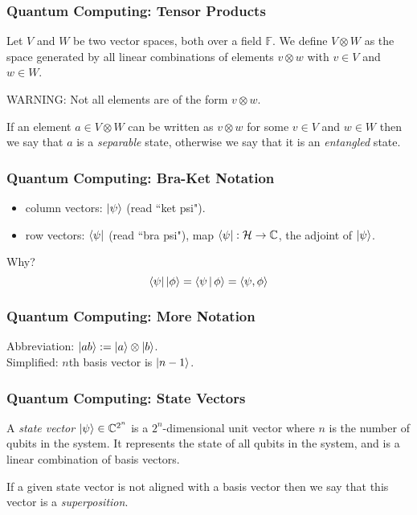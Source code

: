 \documentclass{beamer}
\renewcommand{\bra}{\Bra}
\renewcommand{\ket}{\Ket}
\renewcommand{\braket}{\Braket}
\newcommand{\inner}[2]{\left\langle #1, #2 \right\rangle}
\newcommand{\tensor}{\otimes}
\newcommand{\bb}[1]{\mathbb{#1}}
\renewcommand{\cal}[1]{\mathcal{#1}}
\begin{document}
\begin{frame}
\frametitle{Quantum Computing: Tensor Products}
        \begin{definition}\label{def:tensor_product_of_vector_spaces}
            Let $V$ and $W$ be two vector spaces, both over a field $\bb{F}$.
            We define $V \otimes W$ as the space generated by all linear combinations of elements $v \otimes w$ with $v \in V$ and $w \in W$.
        \end{definition}\pause
        WARNING: Not all elements are of the form $v \otimes w$.\pause
        \begin{definition}\label{def:separable_and_entangled_states}
            If an element $a \in V \otimes W$ can be written as $v \otimes w$ for some $v \in V$ and $w \in W$ then we say that $a$ is a \textit{separable} state, otherwise we say that it is an \textit{entangled} state.
        \end{definition}
\end{frame}

\begin{frame}
\frametitle{Quantum Computing: Bra-Ket Notation}
        \begin{itemize}
        \item column vectors: $\ket{\psi}$ (read ``ket psi").\pause
        \item row vectors: $\bra{\psi}$ (read ``bra psi"), map $\bra{\psi} : \cal{H} \to \bb{C}$, the adjoint of $\ket{\psi}$.
        \end{itemize}\pause
        Why?\pause
        $$\bra{\psi} \ket{\phi} = \braket{\psi | \phi} = \inner{\psi}{\phi}$$
\end{frame}

\begin{frame}
\frametitle{Quantum Computing: More Notation}
        Abbreviation: $\ket{ab} := \ket{a} \tensor \ket{b}$.\\\pause
        Simplified: $n$th basis vector is $\ket{n-1}$.
\end{frame}

\begin{frame}
\frametitle{Quantum Computing: State Vectors}
        \begin{definition}\label{def:state_vector}
            A \textit{state vector} $\ket{\psi} \in \bb{C}^{2^n}$ is a $2^n$-dimensional unit vector where $n$ is the number of qubits in the system.
            It represents the state of all qubits in the system, and is a linear combination of basis vectors.
        \end{definition}\pause
        \begin{definition}[Superposition]\label{def:superposition}
            If a given state vector is not aligned with a basis vector then we say that this vector is a \textit{superposition}.
        \end{definition}
\end{frame}
\end{document}
